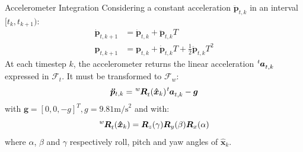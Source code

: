 \documentclass[10pt]{beamer}
\begin{document}

    \begin{frame}{Accelerometer Integration}
        Considering a constant acceleration $\bm{\ddot{p}}_{t, k}$ in an
        interval $[t_k, t_{k+1})$:
        \begin{align*}
            \bm{\dot{p}}_{t, k+1} &= \bm{\dot{p}}_{t, k} + \bm{\ddot{p}}_{t, k} T \\
            \bm{p}_{t, k+1} &= \bm{p}_{t, k} + \bm{\dot{p}}_{t, k} T + \frac{1}{2} \bm{\ddot{p}}_{t, k} T^2
        \end{align*}
        At each timestep $k$, the accelerometer returns the linear acceleration
        $\tensor[^t]{\bm{a}}{_{t,k}}$ expressed in $\mathcal{F}_t$.
        It must be transformed to $\mathcal{F}_w$:
        \begin{equation*}
            \bm{\ddot{p}}_{t,k} = \tensor[^w]{\bm{R}}{_t}(\bm{\hat{x}}_{k}) \tensor[^t]{\bm{a}}{_{t,k}} - \bm{g}
        \end{equation*}
        with $\bm{g} = [0, 0, -g]^T, g = 9.81 \text{m/s}^2$ and with:
        \begin{equation*}
            \tensor[^w]{\bm{R}}{_t}(\bm{\hat{x}}_{k}) = \bm{R}_z(\gamma) \bm{R}_y(\beta) \bm{R}_x(\alpha)
        \end{equation*}
        where $\alpha$, $\beta$ and $\gamma$ respectively
        roll, pitch and yaw angles of $\bm{\hat{x}}_{k}$.
    \end{frame}
\end{document}
